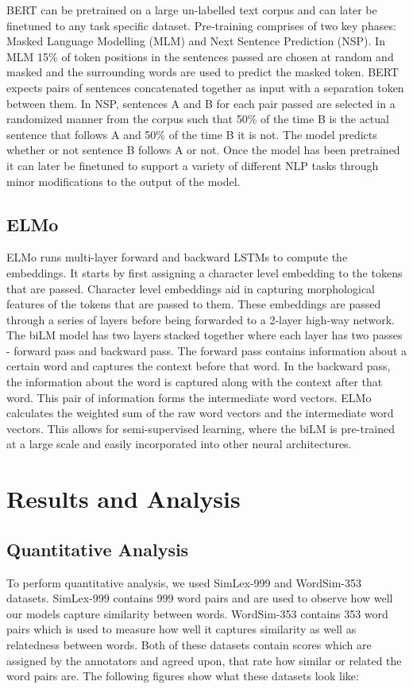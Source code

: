 \documentclass[format=acmsmall,review=true,screen=true]{acmart}
\begin{document}
BERT can be pretrained on a large un-labelled text corpus and can later be finetuned to any task specific dataset. Pre-training comprises of two key phases: Masked Language Modelling (MLM) and Next Sentence Prediction (NSP). In MLM 15\% of token positions in the sentences passed are chosen at random and masked and the surrounding words are used to predict the masked token. BERT expects pairs of sentences concatenated together as input with a separation token between them. In NSP, sentences A and B for each pair passed are selected in a randomized manner from the corpus such that 50\% of the time B is the actual sentence that follows A and 50\% of the time B it is not. The model predicts whether or not sentence B follows A or not. Once the model has been pretrained it can later be finetuned to support a variety of different NLP tasks through minor modifications to the output of the model.


    \subsection{ELMo}
    ELMo runs multi-layer forward and backward LSTMs to compute the embeddings. It starts by first assigning a character level embedding to the tokens that are passed. Character level embeddings aid in capturing morphological features of the tokens that are passed to them. These embeddings are passed through a series of layers before being forwarded to a 2-layer high-way network. The biLM model has two layers stacked together where each layer has two passes - forward pass and backward pass. The forward pass contains information about a certain word and captures the context before that word. In the backward pass, the information about the word is captured along with the context after that word. This pair of information forms the intermediate word vectors.  ELMo calculates the weighted sum of the raw word vectors and the intermediate word vectors. This allows for semi-supervised learning, where the biLM is pre-trained at a large scale and easily incorporated into other neural architectures.
    \section{Results and Analysis}

    
    
    \subsection{Quantitative Analysis}
    To perform quantitative analysis, we used SimLex-999 and WordSim-353 datasets. SimLex-999 contains 999 word pairs and are used to observe how well our models capture similarity between words. WordSim-353 contains 353 word pairs which is used to measure how well it captures similarity as well as relatedness between words. Both of these datasets contain scores which are assigned by the annotators and agreed upon, that rate how similar or related the word pairs are. The following figures show what these datasets look like:
    
\end{document}
